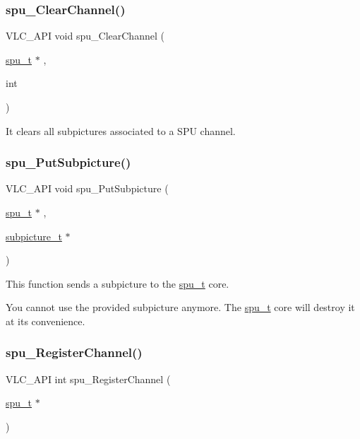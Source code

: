 \subsubsection{\texorpdfstring{spu\+\_\+\+Clear\+Channel()}{spu\_ClearChannel()}}
{\footnotesize\ttfamily V\+L\+C\+\_\+\+A\+PI void spu\+\_\+\+Clear\+Channel (\begin{DoxyParamCaption}\item[{\hyperlink{structspu__t}{spu\+\_\+t} $\ast$}]{,  }\item[{int}]{ }\end{DoxyParamCaption})}

It clears all subpictures associated to a S\+PU channel. \mbox{\label{group__spu_gad59fdd18b195cf3f1009ae648462570a}} 
\subsubsection{\texorpdfstring{spu\+\_\+\+Put\+Subpicture()}{spu\_PutSubpicture()}}
{\footnotesize\ttfamily V\+L\+C\+\_\+\+A\+PI void spu\+\_\+\+Put\+Subpicture (\begin{DoxyParamCaption}\item[{\hyperlink{structspu__t}{spu\+\_\+t} $\ast$}]{,  }\item[{\hyperlink{structsubpicture__t}{subpicture\+\_\+t} $\ast$}]{ }\end{DoxyParamCaption})}

This function sends a subpicture to the \hyperlink{structspu__t}{spu\+\_\+t} core.

You cannot use the provided subpicture anymore. The \hyperlink{structspu__t}{spu\+\_\+t} core will destroy it at its convenience. \mbox{\label{group__spu_gaf4b3f9a5ac28cd9ead38e2f9fd9aeff0}} 
\subsubsection{\texorpdfstring{spu\+\_\+\+Register\+Channel()}{spu\_RegisterChannel()}}
{\footnotesize\ttfamily V\+L\+C\+\_\+\+A\+PI int spu\+\_\+\+Register\+Channel (\begin{DoxyParamCaption}\item[{\hyperlink{structspu__t}{spu\+\_\+t} $\ast$}]{ }\end{DoxyParamCaption})}

